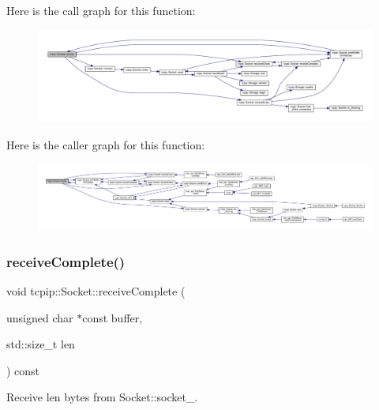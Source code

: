 Here is the call graph for this function\+:
\nopagebreak
\begin{figure}[H]
\begin{center}
\leavevmode
\includegraphics[width=350pt]{classtcpip_1_1_socket_a1da162e961fee9f1a1450df9700fd468_cgraph}
\end{center}
\end{figure}
Here is the caller graph for this function\+:
\nopagebreak
\begin{figure}[H]
\begin{center}
\leavevmode
\includegraphics[width=350pt]{classtcpip_1_1_socket_a1da162e961fee9f1a1450df9700fd468_icgraph}
\end{center}
\end{figure}
\mbox{\label{classtcpip_1_1_socket_ac752adee7260dc7e7778f639febc0cf1}} 
\subsubsection{\texorpdfstring{receive\+Complete()}{receiveComplete()}}
{\footnotesize\ttfamily void tcpip\+::\+Socket\+::receive\+Complete (\begin{DoxyParamCaption}\item[{unsigned char $\ast$const}]{buffer,  }\item[{std\+::size\+\_\+t}]{len }\end{DoxyParamCaption}) const\hspace{0.3cm}{\ttfamily [protected]}}



Receive {\ttfamily len} bytes from Socket\+::socket\+\_\+. 


